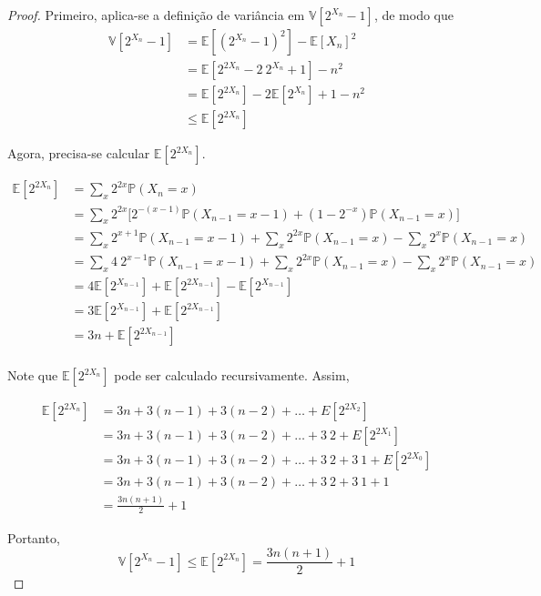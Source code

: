 \begin{proof}
Primeiro, aplica-se a definição de variância em $\mathbb{V}[2^{X_n} - 1]$, de modo que
\begin{align*}
  \mathbb{V}[2^{X_n} - 1] 
    &= \mathbb{E}[(2^{X_n} - 1) ^ 2] - \mathbb{E}[X_n]^2  \\
    &= \mathbb{E}[2^{2X_n} -2 \ 2^{X_n} + 1] - n^2 \\
    &= \mathbb{E}[2^{2X_n}] -2 \mathbb{E} [2^{X_n}] + 1 - n^2 \\
    &\leq \mathbb{E}[2^{2X_n}]
\end{align*}

Agora, precisa-se calcular $\mathbb{E}[2^{2X_n}]$.

\begin{align*}
  \mathbb{E}[2^{2X_n}]  
    &=  \sum_{x} 2^{2x} \mathbb{P}(X_n = x) \\
    &=  \sum_{x} 2^{2x} \Big[ 2^{-(x-1)} \mathbb{P}(X_{n-1} = x-1) + (1 - 2^{-x}) \mathbb{P}(X_{n-1} = x) \Big] \\
    &=  \sum_{x} 2^{x+1} \mathbb{P}(X_{n-1} = x-1) + \sum_{x} 2^{2x} \mathbb{P}(X_{n-1} = x) - \sum_{x} 2^{x} \mathbb{P}(X_{n-1} = x) \\
    &=  \sum_{x} 4 \ 2^{x-1} \mathbb{P}(X_{n-1} = x-1) + \sum_{x} 2^{2x} \mathbb{P}(X_{n-1} = x) - \sum_{x} 2^{x} \mathbb{P}(X_{n-1} = x)  \\
    &=  4 \mathbb{E}[2^{X_{n-1}}] + \mathbb{E}[2^{2X_{n-1}}] - \mathbb{E}[2^{X_{n-1}}]  \\
    &=  3 \mathbb{E}[2^{X_{n-1}}] + \mathbb{E}[2^{2X_{n-1}}]  \\
    &=  3 n + \mathbb{E}[2^{2X_{n-1}}]  \\
\end{align*}

Note que $\mathbb{E}[2^{2X_n}]$ pode ser calculado recursivamente. Assim,

\begin{align*}
  \mathbb{E}[2^{2X_{n}}] 
    &= 3n + 3(n-1) + 3(n-2) + \dots + E[2^{2X_2}] \\
    &= 3n + 3(n-1) + 3(n-2) + \dots + 3 \ 2 + E[2^{2X_1}] \\
    &= 3n + 3(n-1) + 3(n-2) + \dots + 3 \ 2 + 3 \ 1 + E[2^{2X_0}] \\
    &= 3n + 3(n-1) + 3(n-2) + \dots + 3 \ 2 + 3 \ 1 + 1 \\
    &= \frac{3n(n+1)}{2} + 1
\end{align*}

Portanto, 
\[ \mathbb{V}[2^{X_n} - 1] \leq \mathbb{E}[2^{2X_n}] = \frac{3n(n+1)}{2} + 1 \]

\end{proof}


